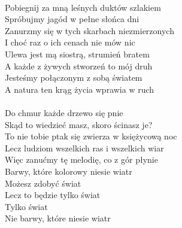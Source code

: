 \documentclass[a5paper, 10pt]{book}
\begin{document}
\begin{minipage}[t]{0.8\textwidth}
\\
Pobiegnij za mną leśnych duktów szlakiem\\
Spróbujmy jagód w pełne słońca dni\\
Zanurzmy się w tych skarbach niezmierzonych\\
I choć raz o ich cenach nie mów nic\vspace*{1.5mm}\\
Ulewa jest mą siostrą, strumień bratem\\
A każde z żywych stworzeń to mój druh\\
Jesteśmy połączonym z sobą światem\\
A natura ten krąg życia wprawia w ruch\\
\\
\hspace*{8mm}Do chmur każde drzewo się pnie \\
\hspace*{8mm}Skąd to wiedzieć masz, skoro ścinasz je?\vspace*{1.5mm}\\
\hspace*{5mm}To nie tobie ptak się zwierza w księżycową noc\\
\hspace*{5mm}Lecz ludziom wszelkich ras i wszelkich wiar\\
\hspace*{5mm}Więc zanućmy tę melodię, co z gór płynie\\
\hspace*{5mm}Barwy, które kolorowy niesie wiatr\vspace*{1.5mm}\\
\hspace*{8mm}Możesz zdobyć świat\\
\hspace*{8mm}Lecz to będzie tylko świat\\
\hspace*{8mm}Tylko świat \\
\hspace*{8mm}Nie barwy, które niesie wiatr \\

\end{minipage}
\end{document}
